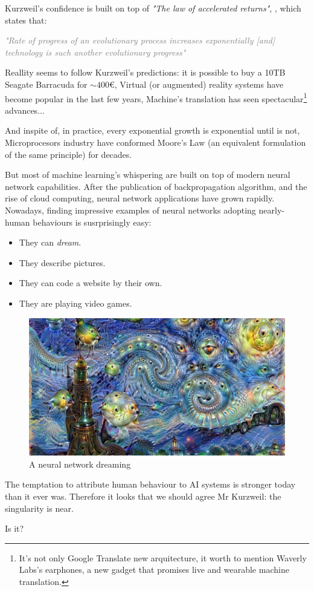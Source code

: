 Kurzweil's confidence is built on top of \textit{"The law of accelerated returns"}, \cite{law}, 
which states that: 

\vspace{.5cm}
\textcolor{gray}{
	\textit {
		\Large {
			"Rate of progress of an evolutionary process increases exponentially 
			[and] technology is such another evolutionary progress"
		}
	}
}
\vspace{.5cm}

Reallity seems to follow Kurzweil's predictions: it is possible to buy a 10TB 
Seagate Barracuda for $\sim400$\euro{}, Virtual (or augmented) reality systems 
have become popular in the last few years, Machine's translation has seen 
spectacular\footnote{
	It's not only Google Translate new arquitecture, it worth to mention Waverly Labs's 
	earphones\cite{pilot}, a new gadget that promises live and wearable machine translation.
} advances... 

And inspite of, in practice, every exponential growth is exponential until is not,
Microprocesors industry have conformed Moore's Law (an equivalent formulation of 
the same principle) for decades.

But most of machine learning's whispering are built on top of modern neural network
capabilities. After the publication of backpropagation \cite{back} algorithm, and the rise 
of cloud computing, neural network applications have grown rapidly. Nowadays, 
finding impressive examples of neural networks adopting nearly-human behaviours 
is susrprisingly easy: 

\begin{itemize}
	\item They can \textit{dream}.\cite{dream}
	\item They describe pictures.\cite{caption}
	\item They can code a website by their own.\cite{code}
	\item They are playing video games.\cite{snake}
\end{itemize}

	\begin{figure}[h!]
\begin{center}
		\includegraphics[width=\linewidth]{images/dream.jpg} %
		\caption{A neural network dreaming} %
		\label{dream} %
\end{center}
	\end{figure}

The temptation to attribute human behaviour to AI systems is stronger today than 
it ever was. Therefore it looks that we should agree Mr Kurzweil: the singularity 
is near. 

Is it?
